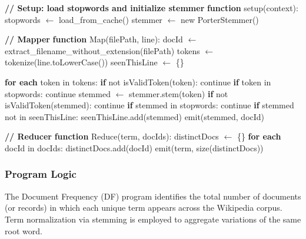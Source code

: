 \documentclass[12pt,a4paper]{article}
\begin{document}
\begin{algorithm}
\caption{Document Frequency --- Map and Reduce}
\begin{algorithmic}[1]

\State \textbf{// Setup: load stopwords and initialize stemmer}
\State \textbf{function} setup(context):
\State \quad stopwords $\gets$ load\_from\_cache()
\State \quad stemmer $\gets$ new PorterStemmer()

\vspace{0.5em}
\State \textbf{// Mapper}
\State \textbf{function} Map(filePath, line):
\State \quad docId $\gets$ extract\_filename\_without\_extension(filePath)
\State \quad tokens $\gets$ tokenize(line.toLowerCase())
\State \quad seenThisLine $\gets$ \{\}

\State \quad \textbf{for each} token in tokens:
\State \qquad \textbf{if} not isValidToken(token):
\State \qquad\quad continue
\State \qquad \textbf{if} token in stopwords:
\State \qquad\quad continue
\State \qquad stemmed $\gets$ stemmer.stem(token)
\State \qquad \textbf{if} not isValidToken(stemmed):
\State \qquad\quad continue
\State \qquad \textbf{if} stemmed in stopwords:
\State \qquad\quad continue
\State \qquad \textbf{if} stemmed not in seenThisLine:
\State \qquad\quad seenThisLine.add(stemmed)
\State \qquad\quad emit(stemmed, docId)

\vspace{0.5em}
\State \textbf{// Reducer}
\State \textbf{function} Reduce(term, docIds):
\State \quad distinctDocs $\gets$ \{\}
\State \quad \textbf{for each} docId in docIds:
\State \qquad distinctDocs.add(docId)
\State \quad emit(term, size(distinctDocs))

\end{algorithmic}
\end{algorithm}

\subsubsection{Program Logic}

The Document Frequency (DF) program identifies the total number of documents (or records) in which each unique term appears across the Wikipedia corpus. Term normalization via stemming is employed to aggregate variations of the same root word.
\end{document}
